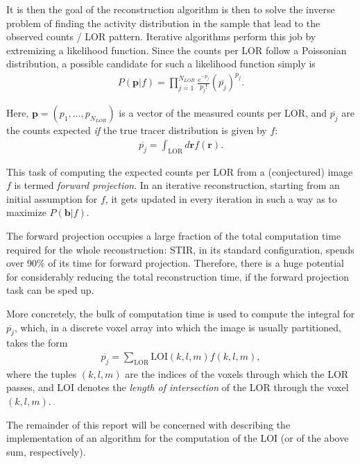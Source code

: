 \documentclass[a4paper, 11pt]{article}
\begin{document}
  It is then the goal of the reconstruction algorithm is then to solve the inverse problem of finding the activity distribution in the sample that lead to the observed counts / LOR pattern. Iterative algorithms perform this job by extremizing a likelihood function. Since the counts per LOR follow a Poissonian distribution, a possible candidate for such a likelihood function simply is
  \begin{align}
    P(\mathbf{p} | f) = \prod_{j = 1}^{N_{LOR}} \frac{e^{-\overline{p_j}}}{p_j!} (\overline{p_j})^{p_j}.
  \end{align}
  
  Here, $\mathbf{p} = (p_1, \ldots, p_{N_{LOR}})$ is a vector of the measured counts per LOR, and $\overline{p_j}$ are the counts expected \textsl{if} the true tracer distribution is given by $f$:
  \begin{align}
    \overline{p_j} = \int_\text{LOR} d\mathbf{r} f(\mathbf{r}).
  \end{align}

  This task of computing the expected counts per LOR from a (conjectured) image $f$ is termed \textsl{forward projection}. In an iterative reconstruction, starting from an initial assumption for $f$, it gets updated in every iteration in such a way as to maximize $P(\mathbf{b} | f)$.

  The forward projection occupies a large fraction of the total computation time required for the whole reconstruction: STIR, in its standard configuration, spends over 90\% of its time for forward projection. Therefore, there is a huge potential for considerably reducing the total reconstruction time, if the forward projection task can be sped up.

  More concretely, the bulk of computation time is used to compute the integral for $\overline{p_j}$, which, in a discrete voxel array into which the image is usually partitioned, takes the form
  \begin{align}
     \overline{p_j} = \sum_\text{LOR} \text{LOI}(k, l, m) f(k, l, m),
     \label{LOR_discrete}
  \end{align}
  where the tuples $(k, l, m)$ are the indices of the voxels through which the LOR passes, and $\text{LOI}$ denotes the \textsl{length of intersection} of the LOR through the voxel $(k, l, m)$.

  The remainder of this report will be concerned with describing the implementation of an algorithm for the computation of the LOI (or of the above sum, respectively).
\end{document}
